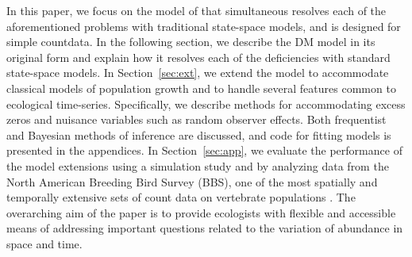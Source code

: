 \documentclass[12pt]{article}
\begin{document}
In this paper, we focus on the model of \citet[henceforth the DM model;]{dail_madsen:2011}
that simultaneous resolves each of the aforementioned problems with
traditional state-space models, and is designed for simple countdata.
In the following section, we describe the DM model in its original
form and explain how it resolves each of the deficiencies with
standard state-space models. In Section~\ref{sec:ext}, we extend the
model to accommodate classical models of population growth and
to handle several features common to ecological
time-series. Specifically, we describe methods for accommodating
excess zeros and nuisance variables such as random observer effects.
Both frequentist and Bayesian methods of inference are discussed, and
code for fitting models is presented in the appendices.
In Section~\ref{sec:app}, we evaluate the performance of the model
extensions using a simulation study and by analyzing data from the
North American Breeding Bird Survey (BBS), one of
the most spatially and temporally extensive sets of count data on
vertebrate populations \citep{robbins_etal:1986}. The overarching aim
of the paper is to provide ecologists with flexible and accessible means of
addressing important questions related to the variation of abundance in
space and time.
\end{document}
